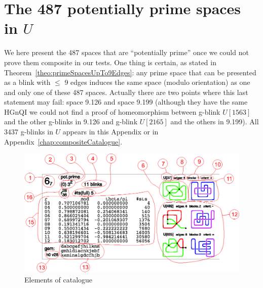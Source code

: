 \chapter{The 487 potentially prime spaces in $U$}
\label{chap:primeCatalogue}

We here present the 487 spaces that are ``potentially prime'' once we could
not prove them composite in our tests. One thing is certain, as stated in
Theorem~\ref{theo:primeSpacesUpTo9Edges}: any prime space that can be
presented as a blink with $\leq$ 9 edges induces the same space (modulo
orientation) as one and only one of these 487 spaces. Actually there
are two points where this last statement may fail: space 9.126 and space 9.199 (although
they have the same HGnQI we could not find a proof of homeomorphism
between g-blink $U[1563]$ and the other g-blinks in 9.126 and g-blink $U[2165]$
and the others in 9.199). All 3437 g-blinks in $U$ appears in this Appendix or
in Appendix~\ref{chap:compositeCatalogue}.

\begin{figure}[htp]
   \begin{center}
      \leavevmode
      \includegraphics[width=14.5cm]{A.figs/catalogueexplanation.eps}
   \end{center}
   \vspace{-0.7cm}
   \caption{ Elements of catalogue}
   \label{fig:catalogueExplanation}
\end{figure}

